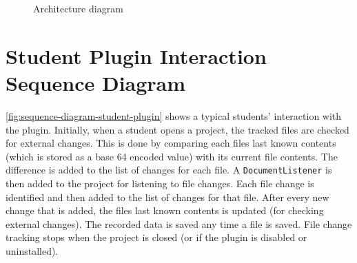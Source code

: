 \begin{figure}[H]
  \centering
  \caption[Final design architecture diagram]{Architecture diagram}
  \label{fig:architecture-diagram}
\end{figure}

\vspace*{\fill}

\newpage

\section{Student Plugin Interaction Sequence Diagram}
\autoref{fig:sequence-diagram-student-plugin} shows a typical students' interaction with the plugin. Initially, when a student opens a project, the tracked files are checked for external changes. This is done by comparing each files last known contents (which is stored as a base 64 encoded value) with its current file contents. The difference is added to the list of changes for each file. A \texttt{DocumentListener} is then added to the project for listening to file changes. Each file change is identified and then added to the list of changes for that file. After every new change that is added, the files last known contents is updated (for checking external changes). The recorded data is saved any time a file is saved. File change tracking stops when the project is closed (or if the plugin is disabled or uninstalled).

\vspace*{\fill}

